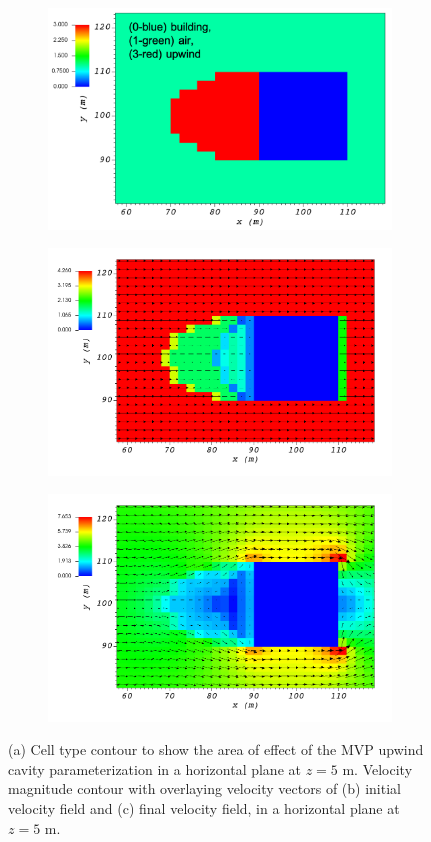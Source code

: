 \begin{figure}[H]
    \centering
    \begin{subfigure}{\textwidth}
    \centering
    \includegraphics[width=10.3cm,keepaspectratio]{Images/upwind_z_5_2_init_icell.png}
    \caption{}
    \end{subfigure}
    \begin{subfigure}{\textwidth}
    \centering
    \includegraphics[width=11.0cm,keepaspectratio]{Images/upwind_z_5_2_init_vel.png}
    \caption{}
    \end{subfigure}
    \begin{subfigure}{\textwidth}
    \centering
    \includegraphics[width=11.0cm,keepaspectratio]{Images/upwind_z_5_2_final.png}
    \caption{}
    \end{subfigure}
    \caption{(a) Cell type contour to show the area of effect of the MVP upwind cavity parameterization in a horizontal plane at $z=5$ m. Velocity magnitude contour with overlaying velocity vectors of (b) initial velocity field and (c) final velocity field, in a horizontal plane at $z=5$ m.}
\end{figure}


